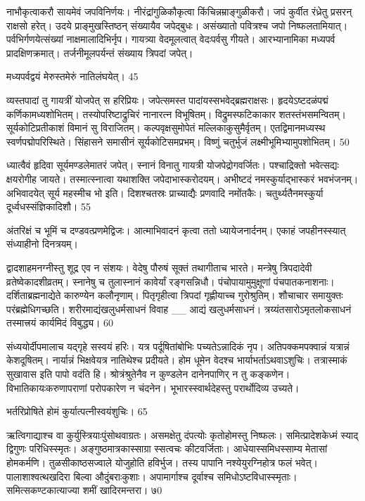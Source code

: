 नाभौकृत्वाकरौ सायमेवं जपविनिर्णयः।
नीरंद्रांगुळिकौकृत्वा किंचिन्नम्राङ्गुळीकरौ।
जपं कुर्वीत रंध्रेतु प्रसरन् राक्षसो हरेत्।
उदये प्राङ्मुखस्तिष्ठन् संख्यायैव जपेद्बुधः।
असंख्यातो पवित्रश्च जपो निष्फलतामियात्।
पर्वभिर्गणयेत्संख्यां नाक्षमालादिभिर्नृप।
गायत्र्या वेदमूलत्वात् वेदःपर्वसु गीयते।
आरभ्यानामिका मध्यपर्व प्रादक्षिणक्रमात्।
तर्जनीमूलपर्यन्तं संख्याय त्रिपदां जपेत्।

मध्यपर्वद्वयं मेरुस्तमेरुं नातिलंघयेत्।
45

व्यस्तपादां तु गायत्रीं योजपेत् स हरिप्रियः।
जपेत्समस्त पादांयस्सभवेद्ब्रह्मराक्षसः।
हृदयेऽष्टदळंपद्मं कर्णिकामध्यशोभितम्।
तस्योपरिष्टाद्रुचिरं नानारत्न विभूषितम्।
विद्रुमस्फटिकाकार शतस्तंभसमन्वितम्।
सूर्यकोटिप्रतीकाशं विमानं सु विराजितम्।
कल्पवृक्षसुमोपेतं मल्लिकाकुसुमैर्वृतम्।
एतद्विमानमध्यस्थ स्वर्णपद्मोपरिस्थिते।
सिंहासने समासीनं सूर्यकोटिसमप्रभम्।
विष्णुं चतुर्भुजं लक्ष्मीभूमिभ्यामुपशोभितम्।
50

ध्यात्वैवं हृदिवा सूर्यमण्डलेमातरं जपेत्।
स्नानं विनातु गायत्री योजपेद्रोगवर्जितः।
पश्चाद्रिक्तो भवेत्सद्यः क्षयरोगीह जायते।
तस्मात्स्नात्वा यथाशक्ति जपेदाभास्करोदयम्।
अभीष्टदं नमस्कुर्याद्भास्करं भवभंजनम्।
अभिवादयेत् सूर्य महस्मीच भो इति।
दिशश्चतस्रः प्राच्याद्यैः प्रणवादि नमोंतकैः।
चतुर्थ्यतैनमस्कुर्या दूर्ध्वधस्संज्ञिकादिशौ।
55

अंतरिक्षं च भूमिं च दण्डवत्प्रणमेद्विजः।
आत्माभिवादनं कृत्वा ततो ध्यायेजनार्दनम्।
एकाहं जपहीनस्स्यात् संध्याहीनो दिनत्रयम्।

द्वादशाहमनग्नीस्तु शूद्र एव न संशयः।
वेदेषु पौरुषं सूक्तं तथागीताच भारते।
मन्त्रेषु त्रिपदादेवी व्रतेष्वेकादशीव्रतम्।
स्नानेषु च तुलास्नानं कावेर्यां रङ्गसन्निधौ।
पंचोपायामुमुक्षूणां पंचपातकनाशनाः।
दर्शिताब्रह्मनाद्येते कारुण्येन कलौनृणाम्।
पितृगृहीत्वा त्रिपदां गृह्णीयाच्च गुरोश्रुतिम्।
शौचाचार समायुक्तः परंब्रह्मेधिगच्छति।
शरीरमाद्यंखलुधर्मसाधनं विवाह
__ आद्यं खलुधर्मसाधनं।
त्रय्यंतसारोऽमृतलोकसाधनं तस्मात्त्रयं
कार्यमिदं विबुद्ध्य।
60

संध्ययोर्दीपमालाच यद्गृहे सस्वयं हरिः।
यत्र पर्दूषितांबोभिः पच्यतेऽन्नादिकं नृप।
अतिपक्कमपक्वान्नं यत्रान्नं केशदूषितम्।
नार्यान्नं भिक्षवेयत्र नातिथेश्च प्रदीयते।
होम धूमेन वेदश्च भार्याभर्ताऽथवाऽशुचिः।
तत्रास्माकं सुखावास इति पापो वदंति हि।
श्रोत्रंश्रुतेनैव न कुण्डलेन
दानेनपाणिर् न तु कङ्कणेन।
विभातिकायःकरुणापराणां परोपकारेण न चंदनेन।
भूभारस्स्वार्थदेहस्तु परार्थोदिव्य उच्यते।

भर्तरिप्रोषिते होमं कुर्यात्पत्नीस्वयंशुचिः।
65

ऋत्विगाद्याश्च वा कुर्युस्त्रियाःपुंसोथवाग्रतः।
असमक्षेतु दंपत्योः कृतोहोमस्तु निष्फलः।
समित्प्रादेशकेध्मं स्याद् द्विगुणः परिधिस्स्मृतः।
अङ्गुष्ठमात्रकास्साग्रा स्सत्वचः कीटवर्जिताः।
आधेयास्समिधस्साम्य मेतासां होमकर्मणि।
तुळसीकाष्ठसज्वाले योजुहोति हविर्भुज।
तस्य पापानि नश्येयुरग्निहोत्र फलं भवेत्।
पालाशाश्वत्थखदिरा बिल्वा औदुंबराःकुशाः।
अपामार्गाश्च दूर्वाश्च समिधोऽष्टविधास्स्मृताः।
समित्सकण्टकात्याज्या शमीं खादिरमन्तरा।
७0

